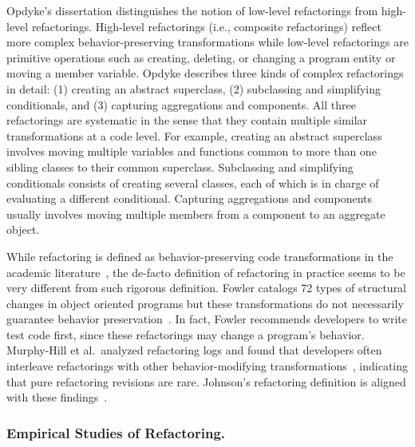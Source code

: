 Opdyke's dissertation \cite{Opdyke1992:ROF} distinguishes the notion of low-level refactorings from high-level refactorings. High-level refactorings (i.e., composite refactorings) reflect more complex behavior-preserving transformations while low-level refactorings are primitive operations such as creating, deleting, or changing a program entity or moving a member variable. Opdyke describes three kinds of complex refactorings in detail: (1) creating an abstract superclass, (2) subclassing and simplifying conditionals, and (3) capturing aggregations and components. All three refactorings are systematic in the sense that they contain multiple similar transformations at a code level. For example, {creating an abstract superclass} involves moving multiple variables and functions common to more than one sibling classes to their common superclass.  {Subclassing and simplifying conditionals} consists of creating  several classes, each of which is in charge of evaluating a different conditional. Capturing aggregations and components usually involves moving {multiple} members from a component to an aggregate object. 

While refactoring is defined as behavior-preserving code transformations in the academic literature~\cite{Mens2004:SSR}, the de-facto definition of refactoring in practice seems to be very different from such rigorous definition. Fowler catalogs 72 types of structural changes in object oriented programs but these transformations do not necessarily guarantee behavior preservation~\cite{1999:RID}. In fact, Fowler recommends developers to write test code first, since these refactorings may change a program's behavior. Murphy-Hill et al.~analyzed refactoring logs and found that developers often interleave refactorings with other behavior-modifying transformations~\cite{Murphy-Hill2012:refactor}, indicating that pure refactoring revisions are rare. Johnson's refactoring definition is aligned with these findings~\cite{Johnson2011}.

\subsubsection{Empirical Studies of Refactoring.} 
\label{sec:refactoringstudies} 

